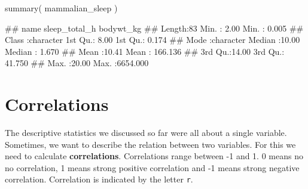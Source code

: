 \documentclass[
]{book}
\newenvironment{Shaded}{\begin{snugshade}}{\end{snugshade}}
\newcommand{\FunctionTok}[1]{\textcolor[rgb]{0.00,0.00,0.00}{#1}}
\newcommand{\NormalTok}[1]{#1}
\begin{document}
\begin{Shaded}
\begin{Highlighting}[]
\FunctionTok{summary}\NormalTok{( mammalian\_sleep )}
\end{Highlighting}
\end{Shaded}

\begin{Shaded}
\begin{Highlighting}[]
\NormalTok{\#\#      name           sleep\_total\_h     bodywt\_kg       }
\NormalTok{\#\#  Length:83          Min.   : 2.00   Min.   :   0.005  }
\NormalTok{\#\#  Class :character   1st Qu.: 8.00   1st Qu.:   0.174  }
\NormalTok{\#\#  Mode  :character   Median :10.00   Median :   1.670  }
\NormalTok{\#\#                     Mean   :10.41   Mean   : 166.136  }
\NormalTok{\#\#                     3rd Qu.:14.00   3rd Qu.:  41.750  }
\NormalTok{\#\#                     Max.   :20.00   Max.   :6654.000}
\end{Highlighting}
\end{Shaded}

\hypertarget{correlations}{%
\section{Correlations}\label{correlations}}

The descriptive statistics we discussed so far were all about a single variable. Sometimes, we want to describe the relation between two variables. For this we need to calculate \textbf{correlations}. Correlations range between -1 and 1. 0 means no no correlation, 1 means strong positive correlation and -1 means strong negative correlation. Correlation is indicated by the letter \texttt{r}.
\end{document}
